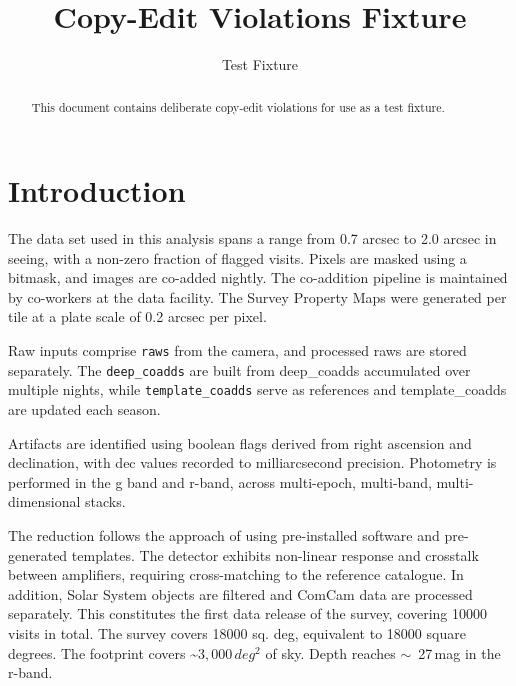\documentclass[twocolumn]{aastex7}
\begin{document}
\title{Copy-Edit Violations Fixture}

\author{Test Fixture}

\begin{abstract}
This document contains deliberate copy-edit violations for use as a test fixture.
\end{abstract}

\section{Introduction}
\label{sec:introduction}

The data set used in this analysis                          %
spans a range from 0.7 arcsec to 2.0 arcsec in seeing,      %
with a non-zero fraction of flagged visits.                 %
Pixels are masked using a bitmask,                         %
and images are co-added nightly.                           %
The co-addition pipeline is maintained by co-workers       %
at the data facility.
The Survey Property Maps were generated per tile           %
at a plate scale of 0.2 arcsec per pixel.                 %

Raw inputs comprise \texttt{raws} from the camera,         %
and processed raws are stored separately.                  %
The \texttt{deep\_coadds} are built from                   %
deep\_coadds accumulated over multiple nights,             %
while \texttt{template\_coadds} serve as references        %
and template\_coadds are updated each season.              %

Artifacts are identified using boolean flags               %
derived from right ascension and declination,              %
with dec values recorded to milliarcsecond precision.      %
Photometry is performed in the g band and r-band,          %
across multi-epoch, multi-band, multi-dimensional stacks.  %

The reduction follows the approach of \cite{Smith2020}     %
using pre-installed software and pre-generated templates.  %
The detector exhibits non-linear response                  %
and crosstalk between amplifiers,                          %
requiring cross-matching to the reference catalogue.       %
In addition, Solar System objects are filtered             %
and ComCam data are processed separately.                  %
This constitutes the first data release of the survey,     %
covering 10000 visits in total.                            %
The survey covers 18000 sq. deg,                           %
equivalent to 18000 square degrees.                        %
The footprint covers \sim$3,000\,deg^2$ of sky.             %
Depth reaches $\sim$~27\,mag in the r-band.                %
\end{document}

